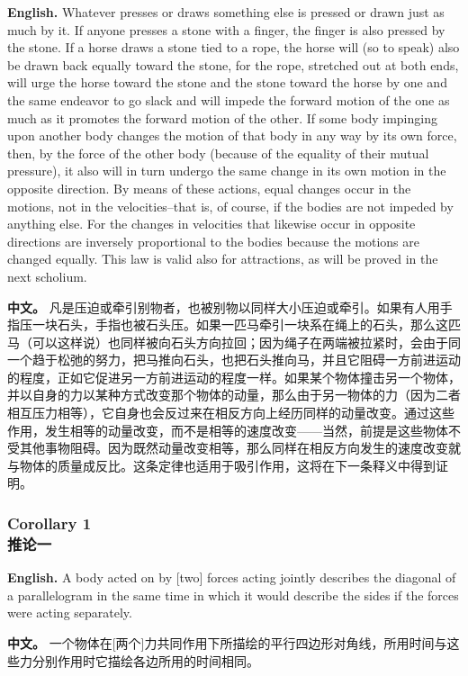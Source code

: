 \noindent\textbf{English.} Whatever presses or draws something else is pressed or drawn just as much by it. If anyone presses a stone with a finger, the finger is also pressed by the stone. If a horse draws a stone tied to a rope, the horse will (so to speak) also be drawn back equally toward the stone, for the rope, stretched out at both ends, will urge the horse toward the stone and the stone toward the horse by one and the same endeavor to go slack and will impede the forward motion of the one as much as it promotes the forward motion of the other. If some body impinging upon another body changes the motion of that body in any way by its own force, then, by the force of the other body (because of the equality of their mutual pressure), it also will in turn undergo the same change in its own motion in the opposite direction. By means of these actions, equal changes occur in the motions, not in the velocities--that is, of course, if the bodies are not impeded by anything else. For the changes in velocities that likewise occur in opposite directions are inversely proportional to the bodies because the motions are changed equally. This law is valid also for attractions, as will be proved in the next scholium.
\par\noindent\textbf{中文。} 凡是压迫或牵引别物者，也被别物以同样大小压迫或牵引。如果有人用手指压一块石头，手指也被石头压。如果一匹马牵引一块系在绳上的石头，那么这匹马（可以这样说）也同样被向石头方向拉回；因为绳子在两端被拉紧时，会由于同一个趋于松弛的努力，把马推向石头，也把石头推向马，并且它阻碍一方前进运动的程度，正如它促进另一方前进运动的程度一样。如果某个物体撞击另一个物体，并以自身的力以某种方式改变那个物体的动量，那么由于另一物体的力（因为二者相互压力相等），它自身也会反过来在相反方向上经历同样的动量改变。通过这些作用，发生相等的动量改变，而不是相等的速度改变——当然，前提是这些物体不受其他事物阻碍。因为既然动量改变相等，那么同样在相反方向发生的速度改变就与物体的质量成反比。这条定律也适用于吸引作用，这将在下一条释义中得到证明。
\medskip

\subsubsection*{Corollary 1\\推论一}
\noindent\textbf{English.} A body acted on by [two] forces acting jointly describes the diagonal of a parallelogram in the same time in which it would describe the sides if the forces were acting separately.
\par\noindent\textbf{中文。} 一个物体在[两个]力共同作用下所描绘的平行四边形对角线，所用时间与这些力分别作用时它描绘各边所用的时间相同。
\medskip

